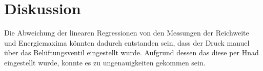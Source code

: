 \section{Diskussion}
\label{sec:Diskussion}

Die Abweichung der linearen Regressionen von den Messungen der Reichweite und Energiemaxima könnten dadurch entstanden sein, dass 
der Druck manuel über das Belüftungsventil eingestellt wurde.
Aufgrund dessen das diese per Hnad eingestellt wurde, konnte es zu ungenauigkeiten gekommen sein. 